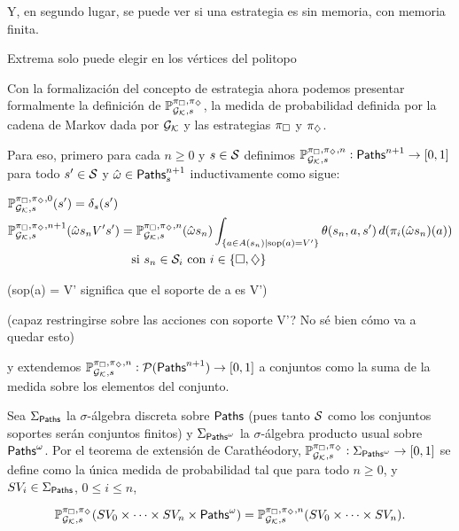 Y, en segundo lugar, se puede ver si una estrategia es sin memoria, con memoria
finita. 

Extrema solo puede elegir en los vértices del politopo


\begin{boxamarillo}{}
	Con la formalización del concepto de estrategia ahora podemos presentar
	formalmente la definición de $\mathbb{P}_{\mathcal{G}_{\mathcal{K}}, s}^{\pi_\square, \pi_\diamondsuit}$, la medida de probabilidad definida por
	la cadena de Markov dada por $\mathcal{G}_{\mathcal{K}}$ y las estrategias $\pi_\square$ y $\pi_\diamondsuit$.

	Para eso, primero para cada $n \geq 0$ y $s \in \mathcal{S}$ definimos $\mathbb{P}^{\pi_\square,
			\pi_\diamondsuit, n}_{\mathcal{G}_{\mathcal{K}}, s} : \textsf{Paths}^{n+1} \rightarrow [0, 1]$ para todo $s' \in \mathcal{S}$
	y $\hat{\omega} \in \textsf{Paths}_s^{n+1}$ inductivamente como sigue:

	\begin{align*}
		&\mathbb{P}^{\pi_\square, \pi_\diamondsuit, 0}_{\mathcal{G}_{\mathcal{K}}, s}(s') = \delta_s(s') \\
		&\mathbb{P}^{\pi_\square, \pi_\diamondsuit, n+1}_{\mathcal{G}_{\mathcal{K}}, s}(\hat{\omega}s_nV's') = \mathbb{P}^{\pi_\square, \pi_\diamondsuit, n}_{\mathcal{G}_{\mathcal{K}}, s}(\hat{\omega} s_n) \int_{\{ a \in A(s_n) \mid \text{sop}(a) = V'\}} \theta(s_n, a, s') \, d(\pi_i(\hat{\omega}s_n)(a)) \\ & \qquad \qquad \qquad \qquad \qquad \text{si } s_n \in \mathcal{S}_i \text{ con } i \in \{\square, \diamondsuit\}
	\end{align*}

	(sop(a) = V' significa que el soporte de a es V')

	(capaz restringirse sobre las acciones con soporte V'? No sé bien cómo va a quedar esto)

	y extendemos \( \mathbb{P}^{\pi_\square, \pi_\diamondsuit, n}_{\mathcal{G}_{\mathcal{K}}, s} :
	\mathcal{P}(\textsf{Paths}^{n+1}) \to [0, 1] \) a conjuntos como la suma de la medida
	sobre los elementos del conjunto.

	Sea \( \Sigma_{\textsf{Paths}} \) la \( \sigma \)-álgebra discreta sobre \( \textsf{Paths} \)
	(pues tanto $\mathcal{S}$ como los conjuntos soportes serán conjuntos finitos) y \(
	\Sigma_{\textsf{Paths}^\omega} \) la \( \sigma \)-álgebra producto usual sobre \(
	\textsf{Paths}^\omega \). Por el teorema de extensión de Carathéodory, \(
	\mathbb{P}^{\pi_\square, \pi_\diamondsuit}_{\mathcal{G}_{\mathcal{K}}, s} : \Sigma_{\textsf{Paths}^\omega} \to [0, 1] \) se
	define como la única medida de probabilidad tal que para todo \( n \geq 0 \), y
	\( SV_i \in \Sigma_{\textsf{Paths}} \), \( 0 \leq i \leq n \),

	\[
		\mathbb{P}^{\pi_\square, \pi_\diamondsuit}_{\mathcal{G}_{\mathcal{K}}, s}(SV_0 \times \dots \times SV_n \times \textsf{Paths}^\omega) = \mathbb{P}^{\pi_\square, \pi_\diamondsuit, n}_{\mathcal{G}_{\mathcal{K}}, s}(SV_0 \times \dots \times SV_n).
	\]
\end{boxamarillo}

